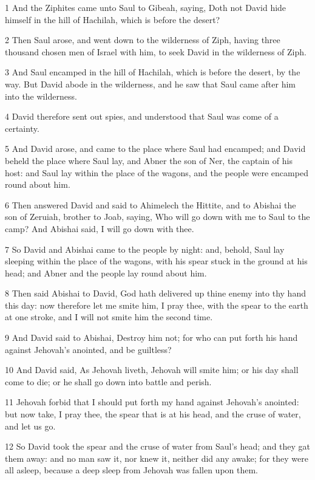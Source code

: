 \par 1 And the Ziphites came unto Saul to Gibeah, saying, Doth not David hide himself in the hill of Hachilah, which is before the desert?
\par 2 Then Saul arose, and went down to the wilderness of Ziph, having three thousand chosen men of Israel with him, to seek David in the wilderness of Ziph.
\par 3 And Saul encamped in the hill of Hachilah, which is before the desert, by the way. But David abode in the wilderness, and he saw that Saul came after him into the wilderness.
\par 4 David therefore sent out spies, and understood that Saul was come of a certainty.
\par 5 And David arose, and came to the place where Saul had encamped; and David beheld the place where Saul lay, and Abner the son of Ner, the captain of his host: and Saul lay within the place of the wagons, and the people were encamped round about him.
\par 6 Then answered David and said to Ahimelech the Hittite, and to Abishai the son of Zeruiah, brother to Joab, saying, Who will go down with me to Saul to the camp? And Abishai said, I will go down with thee.
\par 7 So David and Abishai came to the people by night: and, behold, Saul lay sleeping within the place of the wagons, with his spear stuck in the ground at his head; and Abner and the people lay round about him.
\par 8 Then said Abishai to David, God hath delivered up thine enemy into thy hand this day: now therefore let me smite him, I pray thee, with the spear to the earth at one stroke, and I will not smite him the second time.
\par 9 And David said to Abishai, Destroy him not; for who can put forth his hand against Jehovah's anointed, and be guiltless?
\par 10 And David said, As Jehovah liveth, Jehovah will smite him; or his day shall come to die; or he shall go down into battle and perish.
\par 11 Jehovah forbid that I should put forth my hand against Jehovah's anointed: but now take, I pray thee, the spear that is at his head, and the cruse of water, and let us go.
\par 12 So David took the spear and the cruse of water from Saul's head; and they gat them away: and no man saw it, nor knew it, neither did any awake; for they were all asleep, because a deep sleep from Jehovah was fallen upon them.
